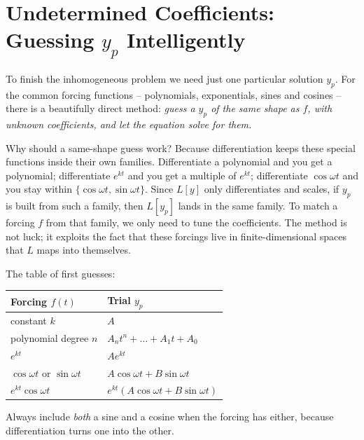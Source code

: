 \section{Undetermined Coefficients: Guessing $y_p$ Intelligently}
\label{ch38:undetermined}

To finish the inhomogeneous problem we need just one particular solution $y_p$.
For the common forcing functions -- polynomials, exponentials, sines and
cosines -- there is a beautifully direct method: \emph{guess a $y_p$ of the same
shape as $f$, with unknown coefficients, and let the equation solve for them.}

\begin{whybox}
Why should a same-shape guess work? Because differentiation keeps these special
functions inside their own families. Differentiate a polynomial and you get a
polynomial; differentiate $e^{kt}$ and you get a multiple of $e^{kt}$;
differentiate $\cos\omega t$ and you stay within $\{\cos\omega t,
\sin\omega t\}$. Since $L[y]$ only differentiates and scales, if $y_p$ is built
from such a family, then $L[y_p]$ lands in the same family. To match a forcing
$f$ from that family, we only need to tune the coefficients. The method is not
luck; it exploits the fact that these forcings live in finite-dimensional spaces
that $L$ maps into themselves.
\end{whybox}

The table of first guesses:
\begin{center}
\begin{tabular}{ll}
\toprule
Forcing $f(t)$ & Trial $y_p$ \\
\midrule
constant $k$ & $A$ \\
polynomial degree $n$ & $A_n t^n + \dots + A_1 t + A_0$ \\
$e^{kt}$ & $A e^{kt}$ \\
$\cos\omega t$ or $\sin\omega t$ & $A\cos\omega t + B\sin\omega t$ \\
$e^{kt}\cos\omega t$ & $e^{kt}(A\cos\omega t + B\sin\omega t)$ \\
\bottomrule
\end{tabular}
\end{center}
Always include \emph{both} a sine and a cosine when the forcing has either,
because differentiation turns one into the other.

